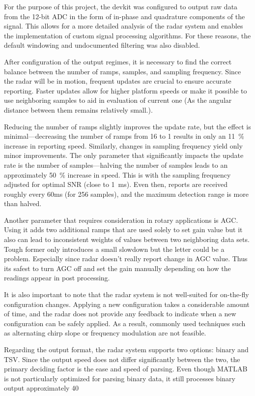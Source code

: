 For the purpose of this project, the devkit was configured to output raw data from the 12-bit ADC in the form of in-phase and quadrature components of the signal.
This allows for a more detailed analysis of the radar system and enables the implementation of custom signal processing algorithms.
For these reasons, the default windowing and undocumented filtering was also disabled.

After configuration of the output regimes, it is necessary to find the correct balance between the number of ramps, samples, and sampling frequency.
Since the radar will be in motion, frequent updates are crucial to ensure accurate reporting.
Faster updates allow for higher platform speeds or make it possible to use neighboring samples to aid in evaluation of current one (As the angular distance between them remains relatively small.).

Reducing the number of ramps slightly improves the update rate, but the effect is minimal—decreasing the number of ramps from 16 to 1 results in only an 11~\% increase in reporting speed.
Similarly, changes in sampling frequency yield only minor improvements.
The only parameter that significantly impacts the update rate is the number of samples—halving the number of samples leads to an approximately 50~\% increase in speed.
This is with the sampling frequency adjusted for optimal SNR (close to 1~ms).
Even then, reports are received roughly every 60ms (for 256 samples), and the maximum detection range is more than halved.


Another parameter that requires consideration in rotary applications is AGC.
Using it adds two additional ramps that are used solely to set gain value but it also can lead to inconsistent weights of values between two neighboring data sets.
Tough former only introduces a small slowdown but the letter could be a problem.
Especially since radar doesn't really report change in AGC value.
Thus its safest to turn AGC off and set the gain manually depending on how the readings appear in post processing.

It is also important to note that the radar system is not well-suited for on-the-fly configuration changes.
Applying a new configuration takes a considerable amount of time, and the radar does not provide any feedback to indicate when a new configuration can be safely applied.
As a result, commonly used techniques such as alternating chirp slope or frequency modulation are not feasible.

Regarding the output format, the radar system supports two options: binary and TSV.
Since the output speed does not differ significantly between the two, the primary deciding factor is the ease and speed of parsing.
Even though MATLAB is not particularly optimized for parsing binary data, it still processes binary output approximately 40%

